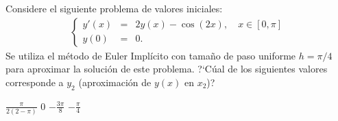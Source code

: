 \begin{pregunta}
\begin{cuerpo}
Considere el siguiente problema de valores iniciales:
\begin{eqnarray*}
\left \{
\begin{array}{lcl}
y'(x)&=& 2y(x)-\cos(2  x), \quad  x \in [0,\pi]\\
y(0)&=&0.
\end{array}
\right.
\end{eqnarray*}
Se utiliza el m\'etodo de Euler Impl\'icito con tama\~no de paso uniforme $h=\pi/4$ para aproximar la soluci\'on de este problema. ?`C\'ual de los siguientes valores corresponde a $y_2$ (aproximaci\'on de $y(x)$ en $x_2$)? 
\end{cuerpo}

\begin{multicols}{4}
\begin{alternativas}
{$\frac{\pi}{2(2-\pi)}$} %
{$0$} 
{$-\frac{3\pi}{8}$} 
{$-\frac{\pi}{4}$}
\end{alternativas}
\end{multicols}
\justificacion{7cm}
\end{pregunta}